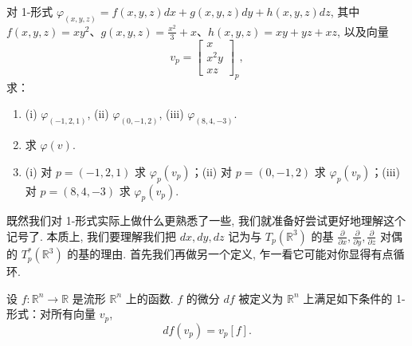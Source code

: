 \begin{question}\label{q:2-10}
对 1-形式 $\varphi_{(x,y,z)}=f(x,y,z)dx+g(x,y,z)dy+h(x,y,z)dz$, 其中 $f(x,y,z)=xy^2$、$g(x,y,z)=\frac{x^2}{3}+x$、$h(x,y,z)=xy+yz+xz$, 以及向量
\[
v_p=\begin{bmatrix}x\\x^2y\\xz\end{bmatrix}_p,
\]
求：
\begin{enumerate}
  \item[(a)] (i) $\varphi_{(-1,2,1)}$, (ii) $\varphi_{(0,-1,2)}$, (iii) $\varphi_{(8,4,-3)}$.
  \item[(b)] 求 $\varphi(v)$.
  \item[(c)] (i) 对 $p=(-1,2,1)$ 求 $\varphi_p(v_p)$；(ii) 对 $p=(0,-1,2)$ 求 $\varphi_p(v_p)$；(iii) 对 $p=(8,4,-3)$ 求 $\varphi_p(v_p)$.
\end{enumerate}
\end{question}

既然我们对 1-形式实际上做什么更熟悉了一些, 我们就准备好尝试更好地理解这个记号了. 本质上, 我们要理解我们把 $dx,dy,dz$ 记为与 $T_p(\mathbb{R}^3)$ 的基 $\frac{\partial}{\partial x},\frac{\partial}{\partial y},\frac{\partial}{\partial z}$ 对偶的 $T_p^*(\mathbb{R}^3)$ 的基的理由. 首先我们再做另一个定义, 乍一看它可能对你显得有点循环.

\begin{definition}[函数的微分]\label{def:2-4-2}
设 $f:\mathbb{R}^n\to\mathbb{R}$ 是流形 $\mathbb{R}^n$ 上的函数. $f$ 的微分 $df$ 被定义为 $\mathbb{R}^n$ 上满足如下条件的 1-形式：对所有向量 $v_p$, 
\[
df(v_p)=v_p[f].
\]
\end{definition}

